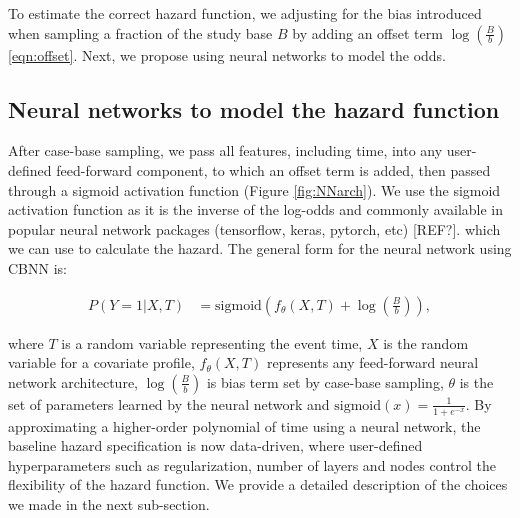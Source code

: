 \documentclass[AMA,STIX1COL,]{WileyNJD-v2}
\begin{document}
To estimate the correct hazard function, we adjusting for the bias
introduced when sampling a fraction of the study base \(B\) by adding an
offset term \(\log\left(\frac{B}{b} \right)\) \eqref{eqn:offset}. Next,
we propose using neural networks to model the odds.

\hypertarget{neural-networks-to-model-the-hazard-function}{%
\subsection{Neural networks to model the hazard
function}\label{neural-networks-to-model-the-hazard-function}}

After case-base sampling, we pass all features, including time, into any
user-defined feed-forward component, to which an offset term is added,
then passed through a sigmoid activation function (Figure
\ref{fig:NNarch}). We use the sigmoid activation function as it is the
inverse of the log-odds and commonly available in popular neural network
packages (tensorflow, keras, pytorch, etc) {[}REF?{]}. which we can use
to calculate the hazard. The general form for the neural network using
CBNN is:

\begin{align}\label{eqn:nnProb}
P\left(Y=1|X,T\right)&=\mathrm{sigmoid}\left(f_{\theta}(X, T) + \log\left(\frac{B}{b}\right) \right),
\end{align}

where \(T\) is a random variable representing the event time, \(X\) is
the random variable for a covariate profile, \(f_{\theta}(X, T)\)
represents any feed-forward neural network architecture,
\(\log\left(\frac{B}{b}\right)\) is bias term set by case-base sampling,
\(\theta\) is the set of parameters learned by the neural network and
\(\mathrm{sigmoid}(x)=\frac{1}{1+e^{-x}}\). By approximating a
higher-order polynomial of time using a neural network, the baseline
hazard specification is now data-driven, where user-defined
hyperparameters such as regularization, number of layers and nodes
control the flexibility of the hazard function. We provide a detailed
description of the choices we made in the next sub-section.
\end{document}
